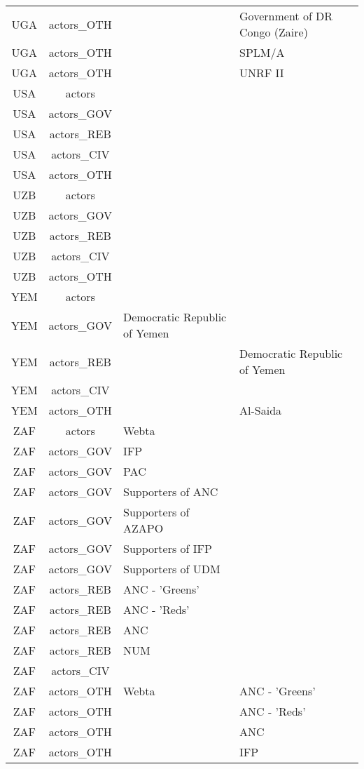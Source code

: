 \documentclass[12pt]{article}
\begin{document}
\begin{center}
\begin{longtable}{|c|c|p{7cm}|p{7cm}|}
  UGA & actors\_OTH &  & Government of DR Congo (Zaire) \\ 
  UGA & actors\_OTH &  & SPLM/A \\ 
  UGA & actors\_OTH &  & UNRF II \\ 
  USA & actors &  &  \\ 
  USA & actors\_GOV &  &  \\ 
  USA & actors\_REB &  &  \\ 
  USA & actors\_CIV &  &  \\ 
  USA & actors\_OTH &  &  \\ 
  UZB & actors &  &  \\ 
  UZB & actors\_GOV &  &  \\ 
  UZB & actors\_REB &  &  \\ 
  UZB & actors\_CIV &  &  \\ 
  UZB & actors\_OTH &  &  \\ 
  YEM & actors &  &  \\ 
  YEM & actors\_GOV & Democratic Republic of Yemen &  \\ 
  YEM & actors\_REB &  & Democratic Republic of Yemen \\ 
  YEM & actors\_CIV &  &  \\ 
  YEM & actors\_OTH &  & Al-Saida \\ 
  ZAF & actors & Webta &  \\ 
  ZAF & actors\_GOV & IFP &  \\ 
  ZAF & actors\_GOV & PAC &  \\ 
  ZAF & actors\_GOV & Supporters of ANC &  \\ 
  ZAF & actors\_GOV & Supporters of AZAPO &  \\ 
  ZAF & actors\_GOV & Supporters of IFP &  \\ 
  ZAF & actors\_GOV & Supporters of UDM &  \\ 
  ZAF & actors\_REB & ANC - 'Greens' &  \\ 
  ZAF & actors\_REB & ANC - 'Reds' &  \\ 
  ZAF & actors\_REB & ANC &  \\ 
  ZAF & actors\_REB & NUM &  \\ 
  ZAF & actors\_CIV &  &  \\ 
  ZAF & actors\_OTH & Webta & ANC - 'Greens' \\ 
  ZAF & actors\_OTH &  & ANC - 'Reds' \\ 
  ZAF & actors\_OTH &  & ANC \\ 
  ZAF & actors\_OTH &  & IFP \\ 

\end{longtable}
\end{center}
\end{document}
